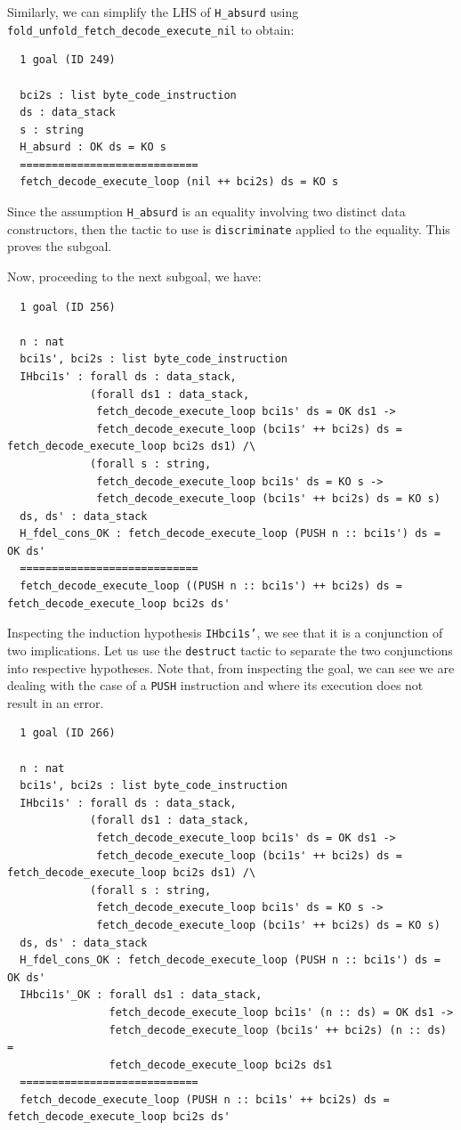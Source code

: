 \documentclass{article}
\begin{document}
Similarly, we can simplify the LHS of \texttt{H\_absurd} using \texttt{fold\_unfold\_fetch\_decode\_execute\_nil} to obtain:

\begin{lstlisting}
  1 goal (ID 249)
  
  bci2s : list byte_code_instruction
  ds : data_stack
  s : string
  H_absurd : OK ds = KO s
  ============================
  fetch_decode_execute_loop (nil ++ bci2s) ds = KO s
\end{lstlisting}

Since the assumption \texttt{H\_absurd} is an equality involving two distinct data constructors, then the tactic to use is \texttt{discriminate} applied to the equality. This proves the subgoal.

Now, proceeding to the next subgoal, we have:

\begin{lstlisting}
  1 goal (ID 256)
  
  n : nat
  bci1s', bci2s : list byte_code_instruction
  IHbci1s' : forall ds : data_stack,
             (forall ds1 : data_stack,
              fetch_decode_execute_loop bci1s' ds = OK ds1 ->
              fetch_decode_execute_loop (bci1s' ++ bci2s) ds = fetch_decode_execute_loop bci2s ds1) /\
             (forall s : string,
              fetch_decode_execute_loop bci1s' ds = KO s ->
              fetch_decode_execute_loop (bci1s' ++ bci2s) ds = KO s)
  ds, ds' : data_stack
  H_fdel_cons_OK : fetch_decode_execute_loop (PUSH n :: bci1s') ds = OK ds'
  ============================
  fetch_decode_execute_loop ((PUSH n :: bci1s') ++ bci2s) ds = fetch_decode_execute_loop bci2s ds'
\end{lstlisting}

Inspecting the induction hypothesis \texttt{IHbci1s'}, we see that it is a conjunction of two implications. Let us use the \texttt{destruct} tactic to separate the two conjunctions into respective hypotheses. Note that, from inspecting the goal, we can see we are dealing with the case of a \texttt{PUSH} instruction and where its execution does not result in an error.

\begin{lstlisting}
  1 goal (ID 266)
  
  n : nat
  bci1s', bci2s : list byte_code_instruction
  IHbci1s' : forall ds : data_stack,
             (forall ds1 : data_stack,
              fetch_decode_execute_loop bci1s' ds = OK ds1 ->
              fetch_decode_execute_loop (bci1s' ++ bci2s) ds = fetch_decode_execute_loop bci2s ds1) /\
             (forall s : string,
              fetch_decode_execute_loop bci1s' ds = KO s ->
              fetch_decode_execute_loop (bci1s' ++ bci2s) ds = KO s)
  ds, ds' : data_stack
  H_fdel_cons_OK : fetch_decode_execute_loop (PUSH n :: bci1s') ds = OK ds'
  IHbci1s'_OK : forall ds1 : data_stack,
                fetch_decode_execute_loop bci1s' (n :: ds) = OK ds1 ->
                fetch_decode_execute_loop (bci1s' ++ bci2s) (n :: ds) =
                fetch_decode_execute_loop bci2s ds1
  ============================
  fetch_decode_execute_loop (PUSH n :: bci1s' ++ bci2s) ds = fetch_decode_execute_loop bci2s ds'
\end{lstlisting}
\end{document}

